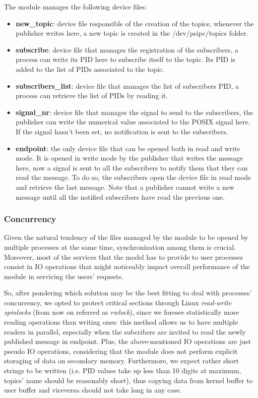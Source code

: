 \documentclass[10pt,a4]{article}
\begin{document}
The module manages the following device files:
\begin{itemize}
  \item \textbf{new\_topic}: device file responsible of the creation of the topics; whenever the publisher writes here, a new topic is created in the /dev/psipc/topics folder.
  \item \textbf{subscribe}: device file that manages the registration of the subscribers, a process can write its PID here to subscribe itself to the topic. Its PID is added to the list of PIDs associated to the topic.
  \item \textbf{subscribers\_list}: device file that manages the list of subscribers PID, a process can retrieve the list of PIDs by reading it.
  \item \textbf{signal\_nr}: device file that manages the signal to send to the subscribers, the publisher can write the numerical value associated to the POSIX signal here.
  If the signal hasn't been set, no notification is sent to the subscribers.
  \item \textbf{endpoint}: the only device file that can be opened both in read and write mode.
  It is opened in write mode by the publisher that writes the message here, now a signal is sent to all the subscribers to notify them that they can read the message.
  To do so, the subscribers open the device file in read mode and retrieve the last message.
  Note that a publisher cannot write a new message until all the notified subscribers have read the previous one.

\end{itemize}

\subsubsection*{Concurrency}
Given the natural tendency of the files managed by the module to be opened by multiple processes at the same time, synchronization among them is crucial. Moreover, most of the services that the model has to provide to user processes consist in IO operations that might noticeably impact overall performance of the module in servicing the users' requests. 

So, after pondering which solution may be the best fitting to deal with processes' concurrency, we opted to protect critical sections through Linux \textit{read-write spinlocks} (from now on referred as \textit{rwlock}), since we foresee statistically more reading operations than writing ones: this method allows us to have multiple readers in parallel, especially when the subcribers are invited to read the newly published message in endpoint. Plus, the above-mentioned IO operations are just pseudo IO operations, considering that the module does not perform explicit storaging of data on secondary memory. Furthermore, we expect rather short strings to be written (i.e. PID values take up less than 10 digits at maximum, topics' name should be reasonably short), thus copying data from kernel buffer to user buffer and viceversa should not take long in any case.
\end{document}
